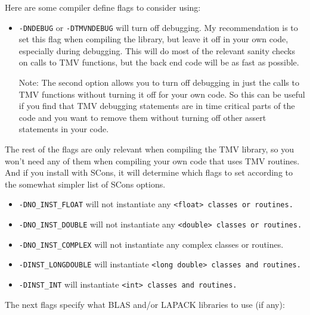 Here are some compiler define flags to consider using:
\begin{itemize}
\item
\texttt{-DNDEBUG} or \texttt{-DTMVNDEBUG}
will turn off debugging.  My recommendation is to set this flag when compiling the library,
but leave it off in your own code, especially during debugging.  This will do most of the 
relevant sanity checks on calls to TMV functions, but the back end code will be as fast as possible.

Note: The second option allows you to turn off debugging in just the calls to TMV functions
without turning it off for your own code.  So this can be useful if you 
find that TMV debugging statements are in time critical parts of the code
and you want to remove them without turning off other assert statements 
in your code.
\end{itemize}
The rest of the flags are only relevant when compiling the TMV library, so you won't 
need any of them when compiling your own code that uses TMV routines.  And if you 
install with SCons, it will determine which flags to set according to the somewhat simpler 
list of SCons options.
\begin{itemize}
\item
\texttt{-DNO\_INST\_FLOAT} will not instantiate any \tt{<float>} classes or routines.
\item
\texttt{-DNO\_INST\_DOUBLE} will not instantiate any \tt{<double>} classes or routines.
\item
\texttt{-DNO\_INST\_COMPLEX} will not instantiate any complex classes or routines.
\item
\texttt{-DINST\_LONGDOUBLE} will instantiate \tt{<long double>} classes and routines.
\item
\texttt{-DINST\_INT} will instantiate \tt{<int>} classes and routines.
\end{itemize}
The next flags specify what BLAS and/or LAPACK libraries to use (if any):
